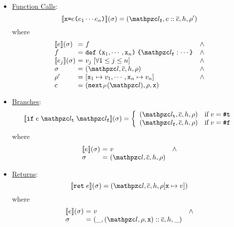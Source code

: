 \begin{itemize}
  \item \underline{Function Calls}:
    \[
      \sem{\varx \kweq \expr \kwrl \expr_1 \cdots \expr_n \kwrr}(\st) =
      (\lab_\varf, \ctxt :: \ctxts, \heap, \env')
    \]
    where
    \[
      \begin{array}{l@{~}c@{~}ll}
        \sem{\expr}(\st) &=& \func &\wedge\\
        \func &=& \kwdef \; \kwrl \varx_1, \cdots, \varx_n
        \kwrr \; \kwcl \lab_\varf: \cdots \kwcr &\wedge\\
        \sem{\expr_j}(\st) &=& \val_j \;
        [\forall 1 \leq j \leq n] &\wedge\\
        \st &=& (\lab, \ctxts, \heap, \env) &\wedge\\
        \env' &=& [\varx_1 \mapsto \val_1, \cdots, \varx_n \mapsto \val_n]
        &\wedge\\
        \ctxt &=& (\getnext{\prog}(\lab), \env, \varx)\\
      \end{array}
    \]

  \item \underline{Branches}:
    \[
      \sem{\kwif \; \expr \; \lab_\vart \; \lab_\varf}(\st) =
      \left\{
        \begin{array}{ll}
          (\lab_\vart, \ctxts, \heap, \env) & \text{if} \; \val = \true\\
          (\lab_\varf, \ctxts, \heap, \env) & \text{if} \; \val = \false\\
        \end{array}
      \right.
    \]
    where
    \[
      \begin{array}{l@{~}c@{~}ll}
      \sem{\expr}(\st) &=& \val &\wedge\\
      \st &=& (\lab, \ctxts, \heap, \env)\\
      \end{array}
    \]

  \item \underline{Returns}:
    \[
      \sem{\kwret \; \expr}(\st) = (\lab, \ctxts, \heap, \env[\varx \mapsto
      \val])
    \]
    where
    \[
      \begin{array}{l@{~}c@{~}ll}
      \sem{\expr}(\st) &=& \val &\wedge\\
      \st &=& (\_, (\lab, \env, \varx) :: \ctxts, \heap, \_)\\
      \end{array}
    \]
\end{itemize}

